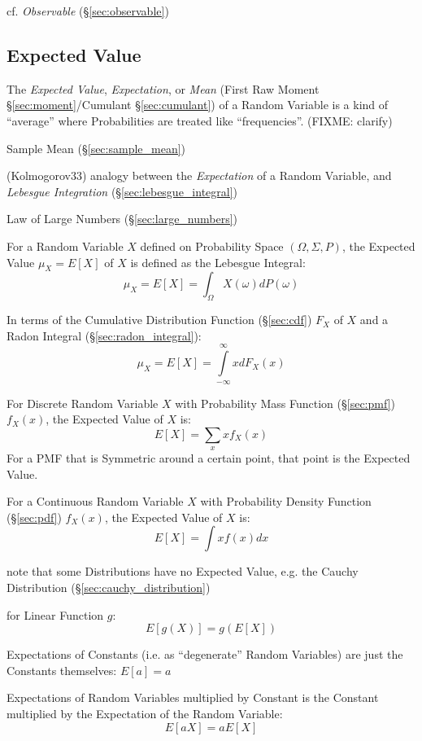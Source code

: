 \fist cf. \emph{Observable} (\S\ref{sec:observable})



\subsection{Expected Value}\label{sec:expected_value}

The \emph{Expected Value}, \emph{Expectation}, or \emph{Mean} (First Raw Moment
\S\ref{sec:moment}/Cumulant \S\ref{sec:cumulant}) of a Random Variable is a kind
of ``average'' where Probabilities are treated like ``frequencies''. (FIXME:
clarify)

\fist Sample Mean (\S\ref{sec:sample_mean})

(Kolmogorov33) analogy between the \emph{Expectation} of a Random Variable, and
\emph{Lebesgue Integration} (\S\ref{sec:lebesgue_integral})

Law of Large Numbers (\S\ref{sec:large_numbers})

For a Random Variable $X$ defined on Probability Space $(\Omega,\Sigma,P)$, the
Expected Value $\mu_X = E[X]$ of $X$ is defined as the Lebesgue Integral:
\[
  \mu_X = E[X] = \int_\Omega X(\omega) dP(\omega)
\]

In terms of the Cumulative Distribution Function (\S\ref{sec:cdf}) $F_X$ of $X$
and a Radon Integral (\S\ref{sec:radon_integral}):
\[
  \mu_X = E[X] = \int\limits_{-\infty}^{\infty} x dF_X(x)
\]

For Discrete Random Variable $X$ with Probability Mass Function
(\S\ref{sec:pmf}) $f_X(x)$, the Expected Value of $X$ is:
\[
  E[X] = \sum_x x f_X(x)
\]
For a PMF that is Symmetric around a certain point, that point is the Expected
Value.

For a Continuous Random Variable $X$ with Probability Density Function
(\S\ref{sec:pdf}) $f_X(x)$, the Expected Value of $X$ is:
\[
  E[X] = \int x f(x) dx
\]

note that some Distributions have no Expected Value, e.g. the Cauchy
Distribution (\S\ref{sec:cauchy_distribution})

for Linear Function $g$:
\[
  E[g(X)] = g(E[X])
\]

Expectations of Constants (i.e. as ``degenerate'' Random Variables) are just
the Constants themselves: $E[a] = a$

Expectations of Random Variables multiplied by Constant is the Constant
multiplied by the Expectation of the Random Variable:
\[
  E[aX] = aE[X]
\]

